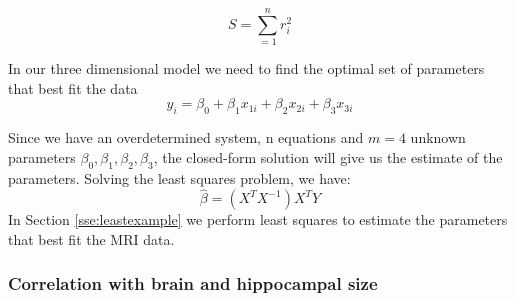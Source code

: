 \documentclass[9pt,twocolumn,twoside]{pnas-new}
\begin{document}
\begin{equation}
S = \sum_{=1}^{n} r_{i}^{2}
\end{equation}

In our three dimensional model we need to find the optimal set of parameters that best fit the data
\begin{equation}
y_i = \beta_0+ \beta_1 x_{1i} + \beta_2 x_{2i} + \beta_3 x_{3i}  
\end{equation}

Since we have an overdetermined system, n equations and $m=4$ unknown parameters $\beta_0,\beta_1,\beta_2,\beta_3$, the closed-form solution will give us the estimate of the parameters.
Solving the least squares problem, we have:
\begin{equation}
\hat{\beta} = (X^TX^{-1})X^TY  
\end{equation}
In Section \ref{sse:leastexample} we perform least squares to estimate the parameters that best fit the MRI data.




\subsubsection*{Correlation with brain and hippocampal size}
\label{sse:leastexample}
\end{document}

